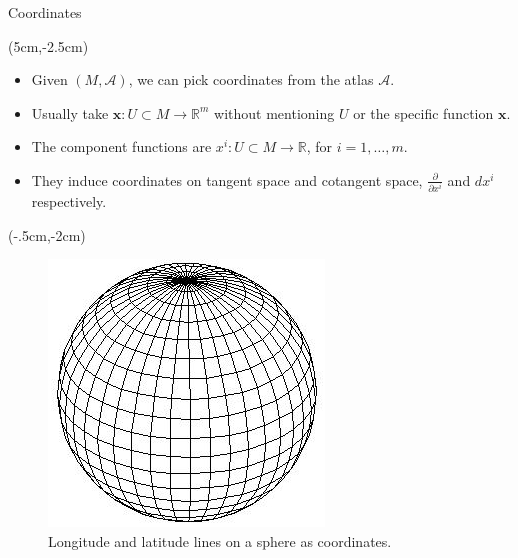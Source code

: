\documentclass[usenames,dvipsnames]{beamer}
\theoremstyle{definition}
\theoremstyle{theorem}
\newcommand{\R}{\mathbb{R}}
\begin{document}
    \begin{frame}{Coordinates}
        \begin{textblock*}{6cm}(5cm,-2.5cm) 
        \begin{itemize}
            \item Given $(M,\mathcal{A})$, we can pick coordinates from the atlas $\mathcal{A}.$
            \item Usually take $\mathbf{x} \colon U\subset M \to \R^m$ without mentioning $U$ or the specific function $\mathbf{x}$.
            \item The component functions are $x^i\colon U \subset M \to \R$, for $i=1,\dots,m$.
            \item They induce coordinates on tangent space and cotangent space, $\frac{\partial}{\partial x^i}$ and $dx^i$ respectively.
            \end{itemize}
            \end{textblock*}
            \begin{textblock*}{5cm}(-.5cm,-2cm)
            \begin{figure}
                \centering
            \includegraphics[scale=.4]{Topological_Hydrodynamics/lat-long-grid.jpg}
            \caption{Longitude and latitude lines on a sphere as coordinates.}
                \label{fig:my_label}
            \end{figure}
            \end{textblock*}
    \end{frame}
    
\end{document}

